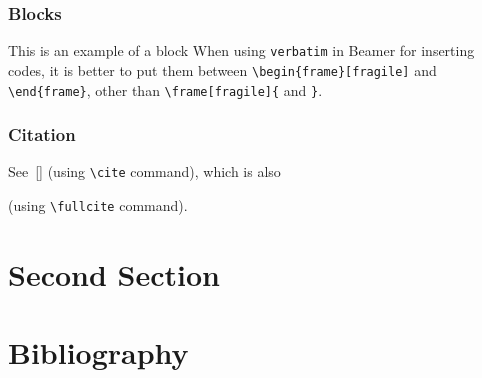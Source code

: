 \documentclass{beamer}
\begin{document}
\begin{frame}[fragile]
	\frametitle{Blocks}
	\begin{block}{This is an example of a block}
	When using \verb+verbatim+ in Beamer for inserting codes, it is better to put them between \verb+\begin{frame}[fragile]+ and \verb+\end{frame}+, other than \verb+\frame[fragile]{+ and \verb+}+.
	\end{block}
\end{frame}

\begin{frame}[fragile]
	\frametitle{Citation}
	
	See~[\cite{Rosen2011}] (using \verb+\cite+ command), which is also
	
	
	(using \verb+\fullcite+ command).
	
\end{frame}

\section{Second Section}

\section{Bibliography}
\end{document}
